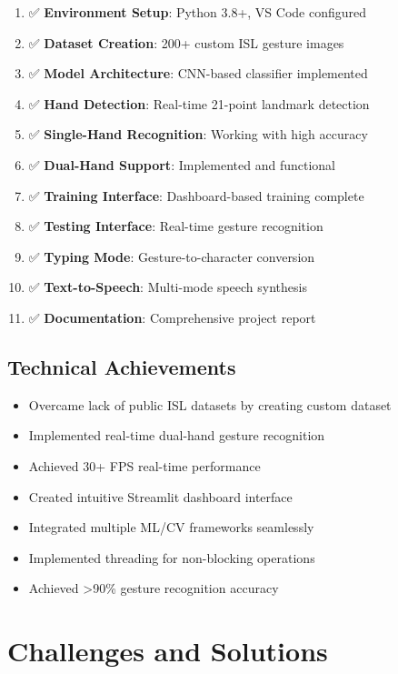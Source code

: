 \begin{enumerate}
    \item ✅ \textbf{Environment Setup}: Python 3.8+, VS Code configured
    \item ✅ \textbf{Dataset Creation}: 200+ custom ISL gesture images
    \item ✅ \textbf{Model Architecture}: CNN-based classifier implemented
    \item ✅ \textbf{Hand Detection}: Real-time 21-point landmark detection
    \item ✅ \textbf{Single-Hand Recognition}: Working with high accuracy
    \item ✅ \textbf{Dual-Hand Support}: Implemented and functional
    \item ✅ \textbf{Training Interface}: Dashboard-based training complete
    \item ✅ \textbf{Testing Interface}: Real-time gesture recognition
    \item ✅ \textbf{Typing Mode}: Gesture-to-character conversion
    \item ✅ \textbf{Text-to-Speech}: Multi-mode speech synthesis
    \item ✅ \textbf{Documentation}: Comprehensive project report
\end{enumerate}

\subsection{Technical Achievements}

\begin{itemize}
    \item Overcame lack of public ISL datasets by creating custom dataset
    \item Implemented real-time dual-hand gesture recognition
    \item Achieved 30+ FPS real-time performance
    \item Created intuitive Streamlit dashboard interface
    \item Integrated multiple ML/CV frameworks seamlessly
    \item Implemented threading for non-blocking operations
    \item Achieved >90\% gesture recognition accuracy
\end{itemize}

\section{Challenges and Solutions}

